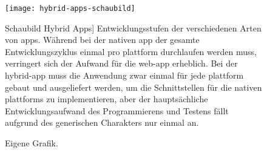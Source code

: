 \begin{figure}[h!]
\centering
\texttt{[image: hybrid-apps-schaubild]}
	\caption
		[Schaubild Hybrid Apps]
		{Entwicklungsstufen der verschiedenen Arten von \glspl{app}. Während bei der nativen \gls{app} der gesamte Entwicklungszyklus einmal pro \gls{plattform} durchlaufen werden muss, verringert sich der Aufwand für die \gls{web-app} erheblich. Bei der \gls{hybrid-app} muss die Anwendung zwar einmal für jede \gls{plattform} gebaut und ausgeliefert werden, um die Schnittstellen für die nativen \glspl{plattform} zu implementieren, aber der hauptsächliche Entwicklungsaufwand des Programmierens und Testens fällt aufgrund des generischen Charakters nur einmal an.}
	\label{fig:hybrid-apps-schaubild}
	\imagesourcefont
	\vspace{\imagesourcespace}
	\imagesourcefont{}
	\caption*{\imagesourcelabel Eigene Grafik.}
\end{figure}


\begin{comment}

\section{Plattformunabhängige App-Entwicklung}


\subsection[Lösungen]{Lösungen für die plattformunabhängige App-Entwicklung}



\end{comment}

